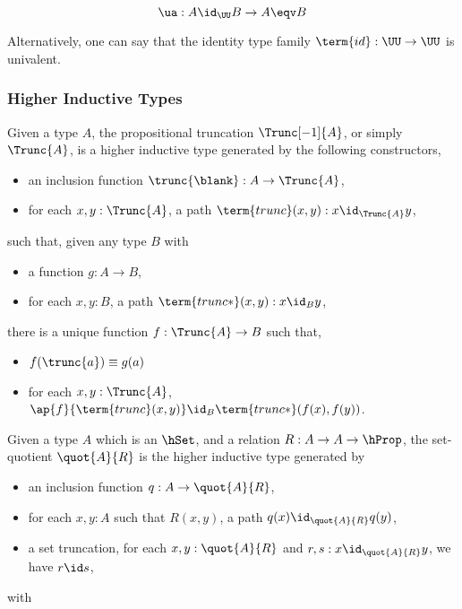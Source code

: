 \[
  \ua : A \id_{\UU} B \to A \eqv B
\]


Alternatively, one can say that the identity type family $\term{id} : \UU \to \UU$ is univalent.

\subsubsection{Higher Inductive Types}



\begin{definition}
  Given a type $A$, the propositional truncation $\Trunc[-1]{A}$, or simply $\Trunc{A}$, is a higher inductive type
  generated by the following constructors,
  \begin{itemize}
    \item an inclusion function $\trunc{\blank} : A \to \Trunc{A}$,
    \item for each $x, y : \Trunc{A}$, a path $\term{trunc}(x,y) : x \id_{\Trunc{A}} y$,
  \end{itemize}
  such that, given any type $B$ with
  \begin{itemize}
    \item a function $g : A \to B$,
    \item for each $x, y : B$, a path $\term{trunc*}(x,y) : x \id_{B} y$,
  \end{itemize}
  there is a unique function $f : \Trunc{A} \to B$ such that,
  \begin{itemize}
    \item $f(\trunc{a}) \equiv g(a)$
    \item for each $x, y : \Trunc{A}$, $\ap{f}{\term{trunc}(x,y)} \id_{B} \term{trunc*}(f(x),f(y))$.
  \end{itemize}
\end{definition}

\begin{definition}
  Given a type $A$ which is an $\hSet$, and a relation $R : A \to A \to \hProp$, the set-quotient $\quot{A}{R}$ is the
  higher inductive type generated by
  \begin{itemize}
    \item an inclusion function $q : A \to \quot{A}{R}$,
    \item for each $x, y : A$ such that $R(x,y)$, a path $q(x) \id_{\quot{A}{R}} q(y)$,
    \item a set truncation, for each $x, y : \quot{A}{R}$ and $r, s : x \id_{\quot{A}{R}} y$, we have $r \id s$,
  \end{itemize}
  with 
\end{definition}

